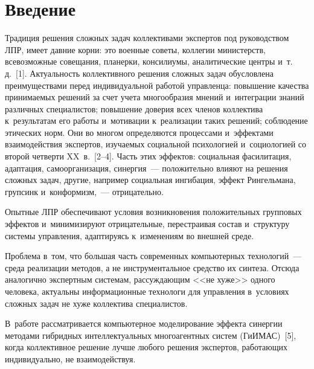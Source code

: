 


\thispagestyle{headings}

\begin{multicols}{2}

\label{st\stat}
  
\section{Введение}

  Традиция решения сложных задач коллективами экспертов под 
руководством ЛПР, имеет давние корни: это 
военные советы, коллегии министерств, всевозможные совещания, планерки, 
консилиумы, аналитические центры и~т.\,д.~[1]. Актуальность коллективного 
решения сложных задач обусловлена преимуществами перед индивидуальной 
работой управленца: повышение качества принимаемых решений за счет учета 
многообразия мнений и~интеграции знаний различных специалистов; 
повышение доверия всех членов коллектива к~результатам его работы 
и~мотивации к~реализации таких решений; соблюдение этических норм. Они во 
многом определяются процессами и~эффектами взаимодействия экспертов, 
изучаемых социальной психологией и~социологией со второй четверти 
XX~в.~[2--4]. Часть этих эффектов: социальная фасилитация, адаптация, 
самоорганизация, синергия~--- положительно влияют на решения сложных задач, 
другие, например социальная ингибация, эффект Рингельмана, групсинк 
и~конформизм,~--- отрицательно. 

Опытные ЛПР обеспечивают условия 
возникновения положительных групповых эффектов и~минимизируют 
отрицательные, перестраивая состав и~структуру системы управления, 
адаптируясь к~изменениям во внешней среде. 
  
  Проблема в~том, что б$\acute{\mbox{о}}$льшая часть современных компьютерных 
технологий~--- среда реализации методов, а не инструментальное средство их 
синтеза. Отсюда аналогично экспертным системам, рассуждающим <<не 
хуже>> одного человека, актуальны информационные технологи для 
управления в~условиях сложных задач не хуже коллектива специалистов. 

В~работе рассматривается компьютерное моделирование эффекта синергии 
методами гиб\-рид\-ных интеллектуальных многоагентных сис\-тем (\mbox{ГиИМАС})~[5], когда 
коллективное решение лучше любого решения экспертов, работающих 
индивидуально, не взаимодействуя. 

\vspace*{-6pt}
  

\end{multicols}
